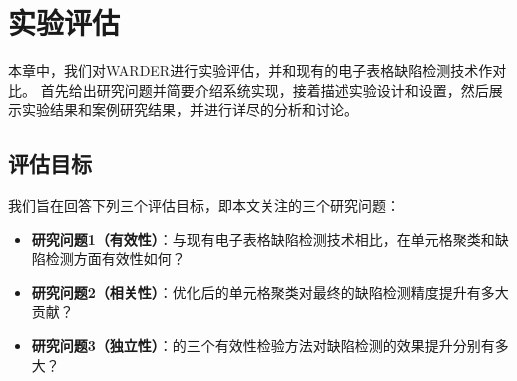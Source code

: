 \chapter{实验评估}

本章中，我们对WARDER进行实验评估，并和现有的电子表格缺陷检测技术作对比。
首先给出研究问题并简要介绍系统实现，接着描述实验设计和设置，然后展示实验结果和案例研究结果，并进行详尽的分析和讨论。


\section{评估目标}
我们旨在回答下列三个评估目标，即本文关注的三个研究问题：
\begin{itemize}
    \item \textbf{研究问题1（有效性）}：与现有电子表格缺陷检测技术相比，\wa 在单元格聚类和缺陷检测方面有效性如何？
    \item \textbf{研究问题2（相关性）}：\wa 优化后的单元格聚类对最终的缺陷检测精度提升有多大贡献？
    \item \textbf{研究问题3（独立性）}：\wa 的三个有效性检验方法对缺陷检测的效果提升分别有多大？
\end{itemize}






